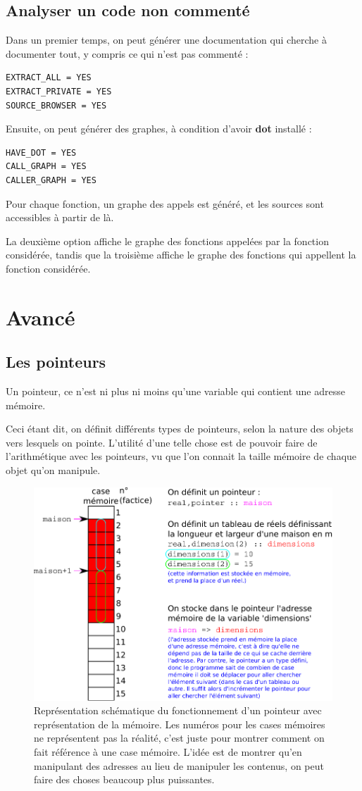 \documentclass[a4paper,twoside]{article}
\begin{document}
\subsection{Analyser un code non commenté}
Dans un premier temps, on peut générer une documentation qui cherche à documenter tout, y compris ce qui n'est pas commenté : 
\begin{verbatim}
EXTRACT_ALL = YES
EXTRACT_PRIVATE = YES
SOURCE_BROWSER = YES
\end{verbatim}

Ensuite, on peut générer des graphes, à condition d'avoir \textbf{dot} installé : 
\begin{verbatim}
HAVE_DOT = YES
CALL_GRAPH = YES
CALLER_GRAPH = YES
\end{verbatim}
Pour chaque fonction, un graphe des appels est généré, et les sources sont accessibles à partir de là. 

La deuxième option affiche le graphe des fonctions appelées par la fonction considérée, tandis que la troisième affiche le graphe des fonctions qui appellent la fonction considérée.

\section{Avancé}
\subsection{Les pointeurs}
Un pointeur, ce n'est ni plus ni moins qu'une variable qui contient une adresse mémoire. 

Ceci étant dit, on définit différents types de pointeurs, selon la nature des objets vers lesquels on pointe. L'utilité d'une telle chose est de pouvoir faire de l'arithmétique avec les pointeurs, vu que l'on connait la taille mémoire de chaque objet qu'on manipule. 

\begin{figure}[htb]
\centering
\includegraphics[width=0.65\linewidth]{figure/pointeurs.pdf}
\caption{Représentation schématique du fonctionnement d'un pointeur avec représentation de la mémoire. Les numéros pour les cases mémoires ne représentent pas la réalité, c'est juste pour montrer comment on fait référence à une case mémoire. L'idée est de montrer qu'en manipulant des adresses au lieu de manipuler les contenus, on peut faire des choses beaucoup plus puissantes.}
\end{figure}
\end{document}
